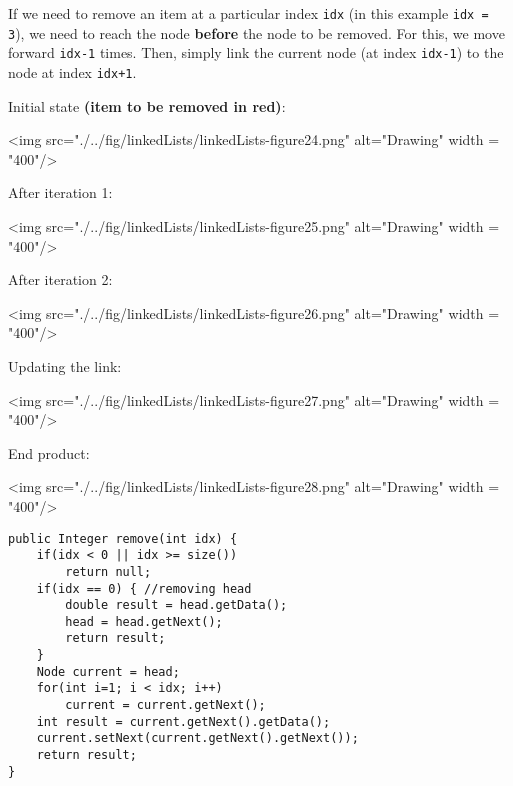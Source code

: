 If we need to remove an item at a particular index \texttt{idx} (in this example \texttt{idx = 3}), we need to reach the node \textbf{before} the node to be removed. For this, we move forward \texttt{idx-1} times. Then, simply link the current node (at index \texttt{idx-1}) to the node at index \texttt{idx+1}.

Initial state \textbf{(item to be removed in red)}:
\vskip 0.2cm

<img src="./../fig/linkedLists/linkedLists-figure24.png" alt="Drawing" width = "400"/>
\vskip 0.2cm

After iteration 1:
\vskip 0.2cm

<img src="./../fig/linkedLists/linkedLists-figure25.png" alt="Drawing" width = "400"/>
\vskip 0.2cm

After iteration 2:
\vskip 0.2cm

<img src="./../fig/linkedLists/linkedLists-figure26.png" alt="Drawing" width = "400"/>
\vskip 0.2cm

Updating the link:

<img src="./../fig/linkedLists/linkedLists-figure27.png" alt="Drawing" width = "400"/>
\vskip 0.2cm

End product:
\vskip 0.2cm

<img src="./../fig/linkedLists/linkedLists-figure28.png" alt="Drawing" width = "400"/>


\newpage

\begin{lstlisting}
public Integer remove(int idx) {
	if(idx < 0 || idx >= size()) 
		return null;
	if(idx == 0) { //removing head
		double result = head.getData();
		head = head.getNext();
		return result;
	}
	Node current = head;
	for(int i=1; i < idx; i++)
		current = current.getNext();
	int result = current.getNext().getData();
	current.setNext(current.getNext().getNext());
	return result;
}
\end{lstlisting}


